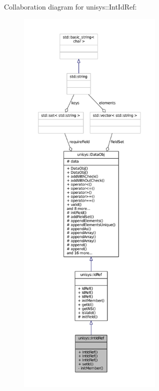 Collaboration diagram for unisys\-:\-:Int\-Id\-Ref\-:
\nopagebreak
\begin{figure}[H]
\begin{center}
\leavevmode
\includegraphics[height=550pt]{classunisys_1_1IntIdRef__coll__graph}
\end{center}
\end{figure}
